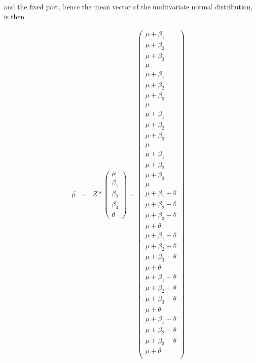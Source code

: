 \documentclass{article}
\begin{document}
and the fixed part, hence the mean vector of the multivariate normal distribution, is then

\begin{eqnarray*}
\overrightarrow{\mu}
&=&  Z*
\left(\begin{array}{ccc}
 \mu	\\
 \beta_{1}	\\
 \beta_{2}	\\
 \beta_{3}  \\
 \theta
 \end{array}\right) 
=
 \left(
 \begin{array}{c}
 \mu +\beta_{1}	 \\
  \mu	+\beta_{2}	\\
  \mu  +\beta_{3}	\\
  \mu	 \\
  \mu +\beta_{1}	 \\
  \mu	+\beta_{2}	\\
  \mu  +\beta_{3}	\\
  \mu	 \\
  \mu +\beta_{1}   \\
  \mu	+\beta_{2}	\\
  \mu  +\beta_{3}	\\
  \mu	 \\
  \mu +\beta_{1}	 \\
  \mu	+\beta_{2}	\\
  \mu  +\beta_{3}	\\
  \mu	\\ 
    \mu	+\beta_{1}	+\theta\\
     \mu	+\beta_{2}	+\theta \\
     \mu  +\beta_{3}	+\theta\\
      \mu	 +\theta\\
      \mu	+\beta_{1}	+\theta\\
     \mu	+\beta_{2}	+\theta  \\
     \mu  +\beta_{3}	+\theta\\
      \mu	+\theta \\ 
      \mu  +\beta_{1}	+\theta\\
     \mu	+\beta_{2}	+\theta \\
     \mu  +\beta_{3}	+\theta\\
      \mu	 +\theta\\
      \mu	+\beta_{1}	+\theta\\
     \mu	+\beta_{2}	+\theta  \\
     \mu  +\beta_{3}	+\theta\\
      \mu	 +\theta\\ 
 \end{array}\right) 
\end{eqnarray*}
\end{document}
